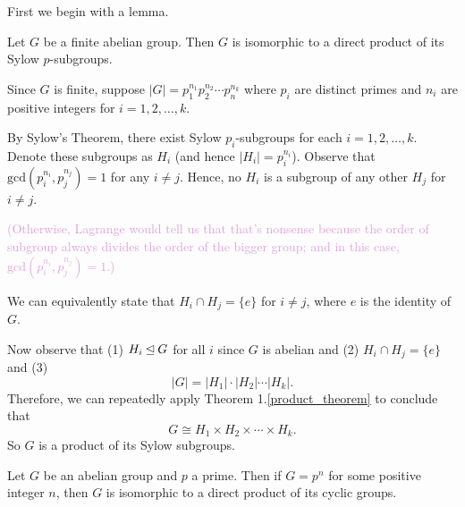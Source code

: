     First we begin with a lemma. 

    \begin{lemma}\label{fund_ab_lemma_1}
        Let $G$ be a finite abelian group. Then $G$ is isomorphic to a
        direct product of its Sylow $p$-subgroups.
    \end{lemma}

    \begin{prf}
        Since $G$ is finite, suppose $|G| = p_1^{n_1}p_2^{n_2}\cdots
        p_n^{n_k}$ where $p_i$ are distinct primes and  $n_i$ are positive
        integers for $i = 1, 2, \dots, k$.

        By Sylow's Theorem, there exist Sylow $p_i$-subgroups for each
        $i = 1, 2, \dots, k$. Denote these subgroups as $H_i$ (and
        hence $|H_i| = p_i^{n_i}$). Observe that $\mbox{gcd}(p_i^{n_i}, p_j^{n_j})
        = 1$ for any $i \ne j$. Hence, no $H_i$ is a subgroup of any
        other $H_j$ for $i \ne j$. 
        
        \textcolor{Plum}{(Otherwise, Lagrange would tell us
        that that's nonsense because the order of subgroup always
        divides the order of the bigger group; and in this case, $\mbox{gcd}(p_i^{n_i}, p_j^{n_j})
        = 1$.)}

        We can equivalently state that $H_i \cap H_j = \{e\}$ for $i
        \ne j$, where $e$ is the identity of $G$.

        Now observe that (1) $H_i \unlhd G$ for all $i$ since $G$ is
        abelian and (2) $H_i \cap H_j = \{e\}$ and (3) 
        \[ 
            |G| = |H_1|\cdot|H_2|\cdots|H_k|.
        \]
        Therefore, we can repeatedly apply Theorem
        1.\ref{product_theorem} to conclude that 
        \[
            G \cong H_1 \times H_2 \times \cdots \times H_k.           
        \]
        So $G$ is a product of its Sylow subgroups.
    \end{prf}

    \begin{lemma}\label{fund_ab_lemma_2}
        Let $G$ be an abelian group and $p$ a prime. Then if $G = p^n$ for some
        positive integer $n$, then $G$ is isomorphic to a direct
        product of its cyclic groups.
    \end{lemma}

